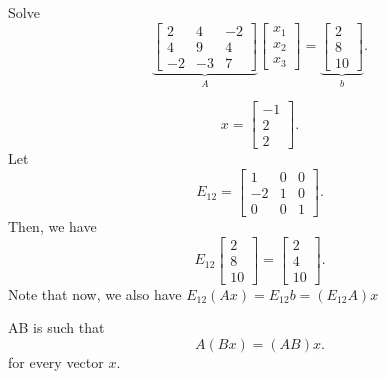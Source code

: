 
\begin{eg}
	Solve
	\[
		\underbrace{\begin{bmatrix}
			2 & 4 & -2 \\ 4 & 9 & 4 \\ -2 & -3 & 7
		\end{bmatrix}}_{A} \begin{bmatrix}
			x_{1} \\ x_{2} \\ x_{3}
		\end{bmatrix}
		= \underbrace{\begin{bmatrix}
			2 \\ 8 \\ 10
		\end{bmatrix}}_{b}
	.\] 
\end{eg}
\begin{explanation}
	\[
		x = \begin{bmatrix}
			-1 \\ 2 \\ 2
		\end{bmatrix}
	.\] 
	Let \[
		E_{12} = \begin{bmatrix}
			1 & 0 & 0 \\ -2 & 1 & 0 \\ 0 & 0 & 1
		\end{bmatrix}
	.\] Then, we have \[
		E_{12} \begin{bmatrix}
			2 \\ 8 \\ 10
		\end{bmatrix} = \begin{bmatrix}
			2 \\ 4 \\ 10
		\end{bmatrix}
	.\] Note that now, we also have \( E_{12}(Ax) = E_{12}b = (E_{12}A)x \)
\end{explanation}

\begin{definition}
	AB is such that \[
		A(Bx) = (AB)x
	.\] for every vector \( x \).
\end{definition}
